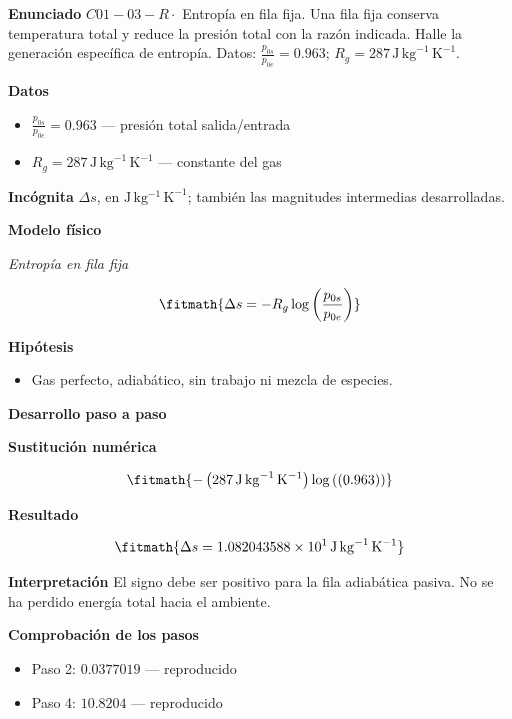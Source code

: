 \documentclass[10pt,openany]{book}
\begin{document}
\begin{tcolorbox}[title={Problema resuelto 3}, studiumworked, breakable]

\noindent\textbf{Enunciado}
\(C01-03-R \cdot\) Entropía en fila fija. Una fila fija conserva temperatura total y reduce la presión total con la razón indicada. Halle la generación específica de entropía. Datos: \(\frac{p_{0s}}{p_{0e}}=0.963\); \(R_g=287\, \mathrm{J}\,\mathrm{kg}^{-1}\,\mathrm{K}^{-1}\).

\noindent\textbf{Datos}
\begin{itemize}
\item $\frac{p_{0s}}{p_{0e}} = 0.963$ — presión total salida/entrada
\item $R_g = 287\,\mathrm{J}\,\mathrm{kg}^{-1}\,\mathrm{K}^{-1}$ — constante del gas
\end{itemize}

\noindent\textbf{Incógnita}
$\Delta s$, en $\mathrm{J\,kg^{-1}\,K^{-1}}$; también las magnitudes intermedias desarrolladas.

\noindent\textbf{Modelo físico}

\noindent\textit{Entropía en fila fija}

\[
\fitmath{\Delta s=- R_g \log{\left(\frac{p_{0s}}{p_{0e}} \right)}}
\]

\noindent\textbf{Hipótesis}
\begin{itemize}
\item Gas perfecto, adiabático, sin trabajo ni mezcla de especies.
\end{itemize}

\noindent\textbf{Desarrollo paso a paso}



\noindent\textbf{Sustitución numérica}

\[
\fitmath{- \left(287\,\mathrm{J}\,\mathrm{kg}^{-1}\,\mathrm{K}^{-1}\right) \log{\left(\left(0.963\right) \right)}}
\]

\noindent\textbf{Resultado}

\[
\fitmath{\Delta s=1.082043588\times10^{1}\,\mathrm{J}\,\mathrm{kg}^{-1}\,\mathrm{K}^{-1}}
\]

\noindent\textbf{Interpretación}
El signo debe ser positivo para la fila adiabática pasiva. No se ha perdido energía total hacia el ambiente.

\noindent\textbf{Comprobación de los pasos}
\begin{itemize}
\item Paso 2: $0.0377019$ — reproducido
\item Paso 4: $10.8204$ — reproducido
\end{itemize}


\end{tcolorbox}
\end{document}
